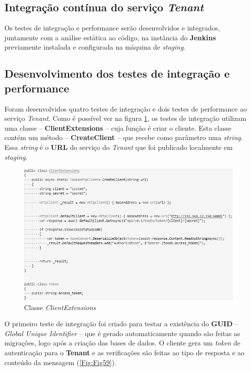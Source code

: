 \subsection{Integração contínua do serviço \textit{Tenant}}

\hspace{1cm}Os testes de integração e performance serão desenvolvidos e integrados, juntamente com a análise estática ao código, na instância do \textbf{Jenkins} previamente instalada e configurada na máquina de \textit{staging}.

\subsection{Desenvolvimento dos testes de integração e performance}

\hspace{1cm}Foram desenvolvidos quatro testes de integração e dois testes de performance ao serviço \textit{Tenant}. Como é possível ver na figura \ref{Fig:Fig58}, os testes de integração utilizam uma classe -- \textbf{ClientExtensions} -- cuja função é criar o cliente. Esta classe contém um método -- \textbf{CreateClient} -- que recebe como parâmetro uma \textit{string}. Essa \textit{string} é o \textbf{URL} do serviço do \textit{Tenant} que foi publicado localmente em \textit{staging}.

\begin{figure}[hbt!]
\centering
\includegraphics[width=0.9\linewidth]{Cap6/TenantClientExtensions.png}
\caption{Classe \textit{ClientExtensions}}
\label{Fig:Fig58}
\end{figure}

\hspace{1cm}O primeiro teste de integração foi criado para testar a existência do \textbf{GUID} -- \textit{Global Unique Identifier} -- que é gerado automaticamente quando são feitas as migrações, logo após a criação das bases de dados. O cliente gera um \textit{token} de autenticação para o \textbf{Tenant} e as verificações são feitas ao tipo de resposta e ao conteúdo da mensagem (\ref{Fig:Fig59}).

